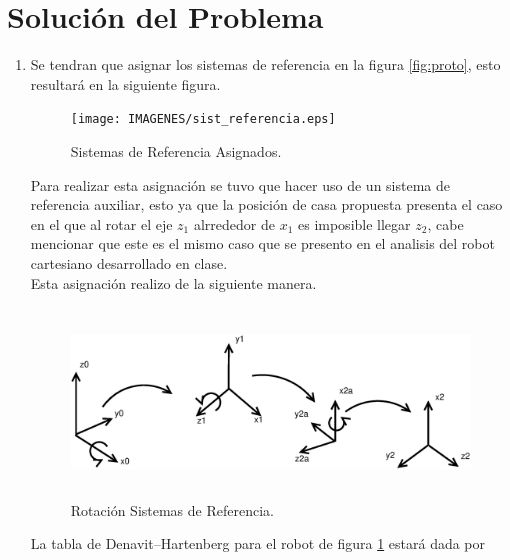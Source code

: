 \documentclass[12pt]{article}
\begin{document}
\section{Solución del Problema}
\begin{enumerate}
    \item Se tendran que asignar los sistemas de referencia en la figura \ref{fig:proto}, esto resultará en la siguiente figura.
    \begin{figure}[h]
        \centering
        \texttt{[image: IMAGENES/sist\_referencia.eps]}
        \caption{Sistemas de Referencia Asignados.}
        \label{fig:reference}
    \end{figure}

    Para realizar esta asignación se tuvo que hacer uso de un sistema de referencia auxiliar, esto ya que la posición de casa propuesta presenta el caso en el que al rotar el eje $z_1$ alrrededor de $x_1$ es imposible llegar $z_2$, cabe mencionar que este es el mismo caso que se presento en el analisis del robot cartesiano desarrollado en clase. 
    \\
    Esta asignación realizo de la siguiente manera.

    \begin{figure}[h]
        \centering
        \includegraphics[width=15cm, height=5cm]{IMAGENES/rotacion.eps}
        \caption{Rotación Sistemas de Referencia.}
        \label{fig:rotaciones}
    \end{figure}

    La tabla de Denavit–Hartenberg para el robot de figura \ref{fig:reference} estará dada por


\end{enumerate}
\end{document}
